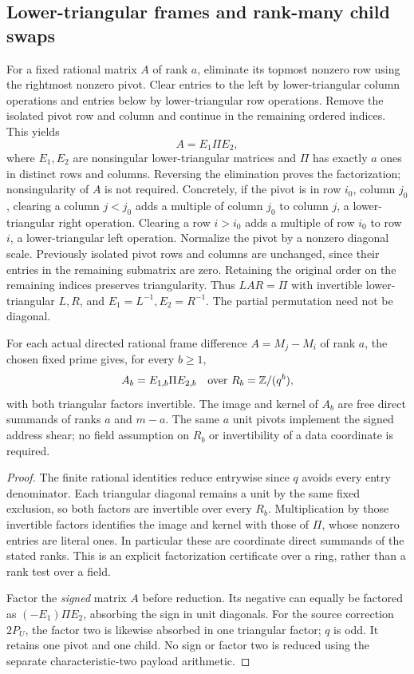 \subsection{Lower-triangular frames and rank-many child swaps}

For a fixed rational matrix $A$ of rank $a$, eliminate its topmost
nonzero row using the rightmost nonzero pivot.  Clear entries to the
left by lower-triangular column operations and entries below by
lower-triangular row operations.  Remove the isolated pivot row and
column and continue in the remaining ordered indices.  This yields
\[
                         A=E_1\Pi E_2,
\]
where $E_1,E_2$ are nonsingular lower-triangular matrices and $\Pi$
has exactly $a$ ones in distinct rows and columns.  Reversing the
elimination proves the factorization; nonsingularity of $A$ is not
required.
Concretely, if the pivot is in row $i_0$, column $j_0$, clearing a
column $j<j_0$ adds a multiple of column $j_0$ to column $j$,
a lower-triangular right operation. Clearing a row $i>i_0$ adds a
multiple of row $i_0$ to row $i$, a lower-triangular left operation.
Normalize the pivot by a nonzero diagonal scale. Previously isolated
pivot rows and columns are unchanged, since their entries in the
remaining submatrix are zero. Retaining the original order on the
remaining indices preserves triangularity. Thus $LAR=\Pi$ with
invertible lower-triangular $L,R$, and $E_1=L^{-1},E_2=R^{-1}$.
The partial permutation need not be diagonal.

\begin{lemma}
\label{lem:swap-signed-module}
For each actual directed rational frame difference $A=M_j-M_i$ of
rank $a$, the chosen fixed prime gives, for every $b\ge1$,
\[
 A_b=E_{1,b}\Pi E_{2,b}\quad\hbox{over }R_b=\mathbb Z/(q^b),
\]
with both triangular factors invertible. The image and kernel of $A_b$
are free direct summands of ranks $a$ and $m-a$. The same $a$ unit
pivots implement the signed address shear; no field assumption on
$R_b$ or invertibility of a data coordinate is required.
\end{lemma}
\begin{proof}
The finite rational identities reduce entrywise since $q$ avoids every
entry denominator. Each triangular diagonal remains a unit by the
same fixed exclusion, so both factors are invertible over every $R_b$.
Multiplication by those invertible factors identifies the image and
kernel with those of $\Pi$, whose nonzero entries are literal ones.
In particular these are coordinate direct summands of the stated ranks.
This is an explicit factorization certificate over a ring, rather than
a rank test over a field.

Factor the \emph{signed} matrix $A$ before reduction. Its negative
can equally be factored as $(-E_1)\Pi E_2$, absorbing the sign in
unit diagonals. For the source correction $2P_U$, the factor two
is likewise absorbed in one triangular factor; $q$ is odd.
It retains one pivot and one child. No sign or factor two is reduced
using the separate characteristic-two payload arithmetic.
\end{proof}

